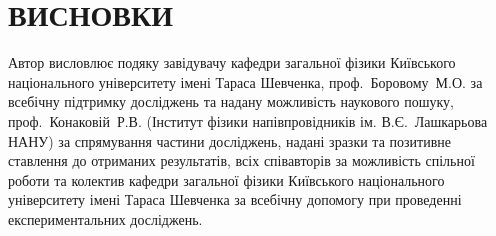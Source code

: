 \chapter*{\MakeUppercase{Висновки}}						%




Автор висловлює подяку
завідувачу кафедри загальної фізики Київського національного університету імені Тараса Шевченка,
проф.~Боровому~М.\:О. за всебічну підтримку досліджень та надану можливість наукового пошуку,
проф.~Конаковій~Р.\:В. (Інститут фізики напівпровідників ім. В.\:Є.~Лашкарьова НАНУ) за спрямування частини досліджень, надані зразки та позитивне ставлення до отриманих результатів,
всіх співавторів за можливість спільної роботи
та колектив кафедри загальної фізики Київського національного університету імені Тараса Шевченка за всебічну допомогу при проведенні експериментальних досліджень.

